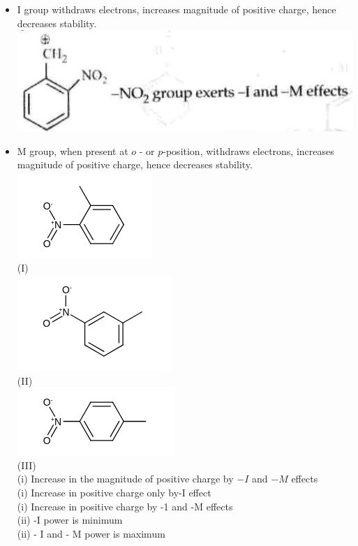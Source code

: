 \documentclass[10pt]{article}
\begin{document}
\begin{itemize}
  \item I group withdraws electrons, increases magnitude of positive charge, hence decreases stability.\\
\includegraphics[max width=\textwidth, center]{2025_01_28_8470952b98110cec3aabg-075}
  \item M group, when present at $o$ - or $p$-position, withdraws electrons, increases magnitude of positive charge, hence decreases stability.\\
\includegraphics{smile-1d67ce6c009f176cab1d5c750ff5aed2724d3bff}\\
(I)\\
\includegraphics{smile-3c3429340f9c353f5c754a9e9e0ed01101e6ae95}\\
(II)\\
\includegraphics{smile-d0f9261f2727809350351238f1dbb2a4710cdafc}\\
(III)\\
(i) Increase in the magnitude of positive charge by $-I$ and $-M$ effects\\
(i) Increase in positive charge only by-I effect\\
(i) Increase in positive charge by -1 and -M effects\\
(ii) -I power is minimum\\
(ii) - I and - M power is maximum
\end{itemize}
\end{document}
